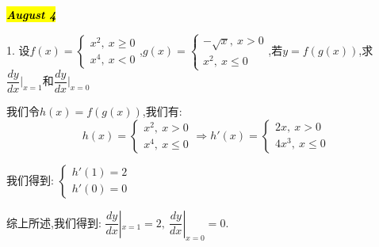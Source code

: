 \hl{\textbf{\textit{August 4}}}

1. 设$f(x)=\left\lbrace
\begin{array}{l}
	x^2,\ x\geq 0\\
	x^4,\ x<0
\end{array}
\right. $,$g(x)=\left\lbrace
\begin{array}{l}
	-\sqrt{x},\ x>0\\
	x^2,\ x\leq 0
\end{array}
\right. $,若$y=f(g(x))$,求$\dfrac{dy}{dx}|_{x=1}$和$\dfrac{dy}{dx}|_{x=0}$
\begin{solution}

	我们令$h(x)=f(g(x))$,我们有:  
	$$h(x)=\left\lbrace
	\begin{array}{l}
		x^2,\ x>0\\
		x^4,\ x\leq 0
	\end{array}
	\right. \Rightarrow h'(x)=\left\lbrace
	\begin{array}{l}
		2x,\ x>0\\
		4x^3,\ x\leq 0
	\end{array}
	\right. $$
	
	我们得到:  $\left\lbrace
	\begin{array}{l}
		h'(1)=2\\
		h'(0)=0
	\end{array}
	\right. $
	
	综上所述,我们得到:  $\dfrac{dy}{dx}|_{x=1}=2,\ \dfrac{dy}{dx}|_{x=0}=0$.
\end{solution}

